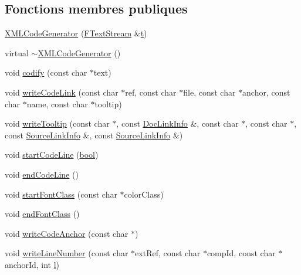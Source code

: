 \subsection*{Fonctions membres publiques}
\begin{DoxyCompactItemize}
\item 
\hyperlink{class_x_m_l_code_generator_a1dd6dbe14d945e6b69470826968cc355}{X\+M\+L\+Code\+Generator} (\hyperlink{class_f_text_stream}{F\+Text\+Stream} \&\hyperlink{058__bracket__recursion_8tcl_a69e959f6901827e4d8271aeaa5fba0fc}{t})
\item 
virtual \hyperlink{class_x_m_l_code_generator_a634d1af5c5c1b597244d07dafb4b6fc4}{$\sim$\+X\+M\+L\+Code\+Generator} ()
\item 
void \hyperlink{class_x_m_l_code_generator_a40ff443bfb15f9f862f8bd3ceb50ce89}{codify} (const char $\ast$text)
\item 
void \hyperlink{class_x_m_l_code_generator_aa0e45ec4ffd221b96f0af9202a098a29}{write\+Code\+Link} (const char $\ast$ref, const char $\ast$file, const char $\ast$anchor, const char $\ast$name, const char $\ast$tooltip)
\item 
void \hyperlink{class_x_m_l_code_generator_afe5258b3e63958ce81ce4895d9ce2334}{write\+Tooltip} (const char $\ast$, const \hyperlink{struct_doc_link_info}{Doc\+Link\+Info} \&, const char $\ast$, const char $\ast$, const \hyperlink{struct_source_link_info}{Source\+Link\+Info} \&, const \hyperlink{struct_source_link_info}{Source\+Link\+Info} \&)
\item 
void \hyperlink{class_x_m_l_code_generator_a44719eff2d9d919cd24aca0f6313b3ea}{start\+Code\+Line} (\hyperlink{qglobal_8h_a1062901a7428fdd9c7f180f5e01ea056}{bool})
\item 
void \hyperlink{class_x_m_l_code_generator_a47927ff273870cc7713f2d20e8c2beb3}{end\+Code\+Line} ()
\item 
void \hyperlink{class_x_m_l_code_generator_aa6d0288952109fba1efe98d82e863b70}{start\+Font\+Class} (const char $\ast$color\+Class)
\item 
void \hyperlink{class_x_m_l_code_generator_adbf57d4544dc1c27571b472f3990a385}{end\+Font\+Class} ()
\item 
void \hyperlink{class_x_m_l_code_generator_a2c6ae0bc633493d36a2b517c44ebb8f4}{write\+Code\+Anchor} (const char $\ast$)
\item 
void \hyperlink{class_x_m_l_code_generator_af06c584af323f840eb54a2ab98acd8c2}{write\+Line\+Number} (const char $\ast$ext\+Ref, const char $\ast$comp\+Id, const char $\ast$anchor\+Id, int \hyperlink{060__command__switch_8tcl_aff56f84b49947b84b2a304f51cf8e678}{l})

\end{DoxyCompactItemize}
